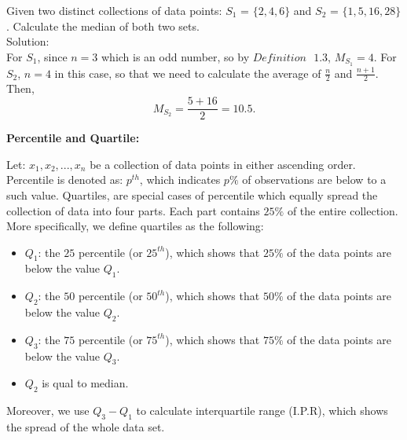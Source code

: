 \begin{example}
Given two distinct collections of data points: $S_1$ = $\{2, 4, 6\}$ and $S_2$ = $\{1, 5, 16, 28\}$. Calculate the median of both two sets.\\


Solution: \\

For $S_1$, since $n = 3$ which is an odd number, so by $Definition \text{ } 1.3$, $M_{S_1} = 4$. For $S_2$, $n = 4$ in this case, so that we need to calculate the average of $\frac{n}{2}$ and $\frac{n+1}{2}$. Then, \[ M_{S_2} = \frac{5+16}{2} = 10.5.\]
\end{example}

\textbf{Percentile and Quartile:}

\begin{definition}
Let: $x_1, x_2, ..., x_n$ be a collection of data points in either ascending order. Percentile is denoted as: $p^{th}$, which indicates $p \%$ of observations are below to a such value. Quartiles, are special cases of percentile which equally spread the collection of data into four parts. Each part contains $25\%$ of the entire collection. More specifically, we define quartiles as the following:
\begin{itemize}
	\item $Q_1$: the $25$ percentile (or $25^{th}$), which shows that $25\%$ of the data points are below the value $Q_1$.
	\item $Q_2$: the $50$ percentile (or $50^{th}$), which shows that $50\%$ of the data points are below the value $Q_2$.
	\item $Q_3$: the $75$ percentile (or $75^{th}$), which shows that $75\%$ of the data points are below the value $Q_3$.
	\item $Q_2$ is qual to median.
\end{itemize}
Moreover, we use $Q_3 - Q_1$ to calculate interquartile range (I.P.R), which shows the spread of the whole data set.
\end{definition}
	
